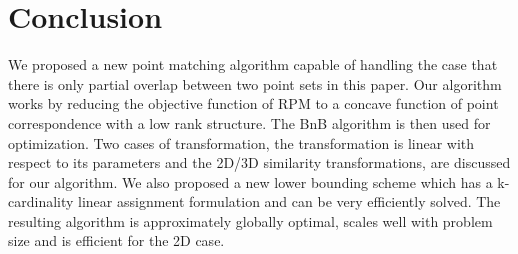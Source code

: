 \documentclass[11pt,bezier,]{article}
\begin{document}
%     
    

    
    
\section{Conclusion \label{sect:conclude}}
We proposed a new point matching algorithm capable of handling  the case that
there is only partial overlap between two point sets in this paper.
Our algorithm works by
reducing the objective function of RPM 
to a concave function of point correspondence
with  a low rank structure.
The BnB algorithm is then used for optimization.
Two cases of transformation,  
the transformation is linear with respect to its parameters and  the  2D/3D similarity transformations,
are discussed for our algorithm.
We also proposed a new lower bounding scheme
which has a k-cardinality linear assignment formulation
and can be very efficiently solved.
The resulting algorithm 
is approximately globally optimal,
scales well with problem size and is efficient for the 2D case.
\end{document}
